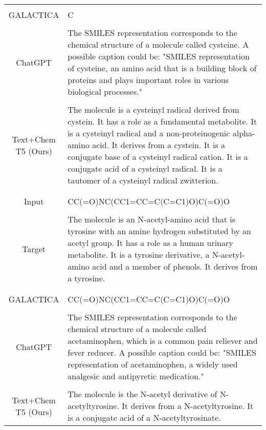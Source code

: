 \documentclass[nohyperref]{article}
\theoremstyle{plain}
\theoremstyle{definition}
\theoremstyle{remark}
\begin{document}
\begin{table}[h!]
{\begin{tabular}{c | p{12cm} }
$$\hdashline\\
GALACTICA &  C  \\\\
ChatGPT & The SMILES representation corresponds to the chemical structure of a molecule called cysteine. A possible caption could be: "SMILES representation of cysteine, an amino acid that is a building block of proteins and plays important roles in various biological processes." 
\\\\
Text+Chem T5 (Ours) & 
The molecule is a cysteinyl radical derived from cystein. It has a role as a fundamental metabolite. It is a cysteinyl radical and a non-proteinogenic alpha-amino acid. It derives from a cystein. It is a conjugate base of a cysteinyl radical cation. It is a conjugate acid of a cysteinyl radical. It is a tautomer of a cysteinyl radical zwitterion.
 \\\\
 &  \\
\toprule
Input  & CC(=O)NC(CC1=CC=C(C=C1)O)C(=O)O \\\\
Target &  
The molecule is an N-acetyl-amino acid that is tyrosine with an amine hydrogen substituted by an acetyl group. It has a role as a human urinary metabolite. It is a tyrosine derivative, a N-acetyl-amino acid and a member of phenols. It derives from a tyrosine.
\\\\
\hdashline\\
GALACTICA & CC(=O)NC(CC1=CC=C(C=C1)O)C(=O)O \\\\
ChatGPT  &
The SMILES representation corresponds to the chemical structure of a molecule called acetaminophen, which is a common pain reliever and fever reducer. A possible caption could be: "SMILES representation of acetaminophen, a widely used analgesic and antipyretic medication."
\\\\
Text+Chem T5 (Ours) & 
The molecule is the N-acetyl derivative of N-acetyltyrosine. It derives from a N-acetyltyrosine. It is a conjugate acid of a N-acetyltyrosinate.
\label{app:example-m2d}
\end{tabular}
}
\end{table}
\end{document}
